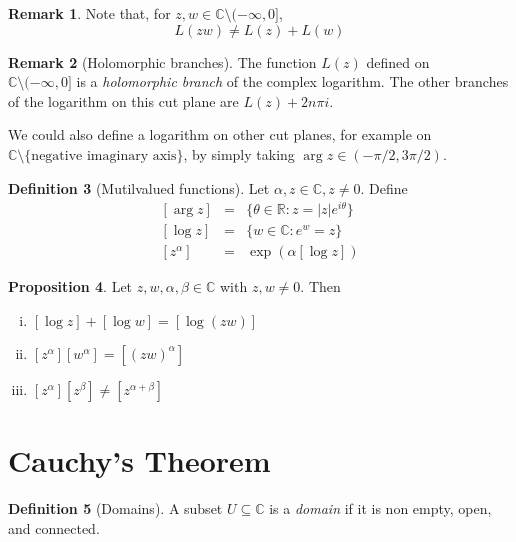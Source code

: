 \documentclass[10pt,fleqn]{article}
\newcommand{\comps}{\mathbb{C}}
\newcommand{\reals}{\mathbb{R}}
\theoremstyle{definition} \newtheorem{defn}{Definition}[section]
\theoremstyle{plain}      \newtheorem{thm}[defn]{Theorem}
\theoremstyle{definition} \newtheorem{prop}[defn]{Proposition}
\theoremstyle{plain}      \newtheorem{lem}[defn]{Lemma}
\theoremstyle{definition} \newtheorem{cor}[defn]{Corollary}
\theoremstyle{definition} \newtheorem{ex}[defn]{Example}
\theoremstyle{definition} \newtheorem{rem}[defn]{Remark}
\begin{document}
\begin{rem}
    Note that, for $z,w\in\comps\setminus(-\infty,0]$,
    \[
        L(zw)\neq
        L(z)+L(w)
    \]
\end{rem}

\begin{rem}[Holomorphic branches]
    The function $L(z)$ defined on \\$\comps\setminus(-\infty,0]$ is a \emph{holomorphic branch} of the complex logarithm.
    The other branches of the logarithm on this cut plane are $L(z)+2n\pi i$.
    
    We could also define a logarithm on other cut planes, for example on \\$\comps\setminus\{\text{negative imaginary axis}\}$, by simply taking $\arg z\in(-\pi/2,3\pi/2)$.
\end{rem}

\begin{defn}[Mutilvalued functions]
    Let $\alpha,z\in\comps,z\neq0$.
    Define
    \begin{equation}
        \begin{array}{rcl}
            [\arg z] &=& \{\theta\in\reals \colon z=|z|e^{i\theta}\}\\
            \left[\log z\right] &=& \{w\in\comps \colon e^w=z\}\\
            \left[z^{\alpha}\right] &=& \exp(\alpha[\log z])
        \end{array}
    \end{equation}
\end{defn}

\begin{prop}
    Let $z,w,\alpha,\beta\in\comps$ with $z,w\neq0$.
    Then
    \begin{enumerate}[(i)]
        \item $[\log z]+[\log w]=[\log(zw)]$
        \item $[z^{\alpha}][w^{\alpha}]=[(zw)^{\alpha}]$
        \item $[z^{\alpha}][z^{\beta}]\neq[z^{\alpha+\beta}]$
    \end{enumerate}
\end{prop}


\section{Cauchy's Theorem}

\begin{defn}[Domains]
    A subset $U\subseteq\comps$ is a \emph{domain} if it is non empty, open, and connected.
\end{defn}
\end{document}
